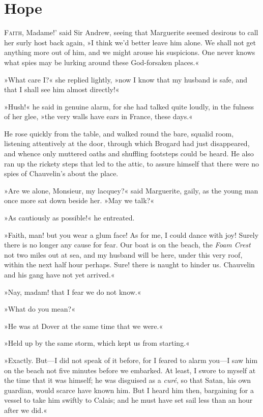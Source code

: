 
\chapter{Hope}
\lettrine[ante=`,lines=4]{F}{aith}, Madame!' said Sir Andrew, seeing that Marguerite seemed desirous to call her surly host back again, »I think we'd better leave him alone. We shall not get anything more out of him, and we might arouse his suspicions. One never knows what spies may be lurking around these God-forsaken places.«

»What care I?« she replied lightly, »now I know that my husband is safe, and that I shall see him almost directly!«

»Hush!« he said in genuine alarm, for she had talked quite loudly, in the fulness of her glee, »the very walls have ears in France, these days.«

He rose quickly from the table, and walked round the bare, squalid room, listening attentively at the door, through which Brogard had just disappeared, and whence only muttered oaths and shuffling footsteps could be heard. He also ran up the rickety steps that led to the attic, to assure himself that there were no spies of Chauvelin's about the place.

»Are we alone, Monsieur, my lacquey?« said Marguerite, gaily, as the young man once more sat down beside her. »May we talk?«

»As cautiously as possible!« he entreated.

»Faith, man! but you wear a glum face! As for me, I could dance with joy! Surely there is no longer any cause for fear. Our boat is on the beach, the \textit{Foam Crest} not two miles out at sea, and my husband will be here, under this very roof, within the next half hour perhaps. Sure! there is naught to hinder us. Chauvelin and his gang have not yet arrived.«

»Nay, madam! that I fear we do not know.«

»What do you mean?«

»He was at Dover at the same time that we were.«

»Held up by the same storm, which kept us from starting.«

»Exactly. But—I did not speak of it before, for I feared to alarm you—I saw him on the beach not five minutes before we embarked. At least, I swore to myself at the time that it was himself; he was disguised as a \textit{curé}, so that Satan, his own guardian, would scarce have known him. But I heard him then, bargaining for a vessel to take him swiftly to Calais; and he must have set sail less than an hour after we did.«

